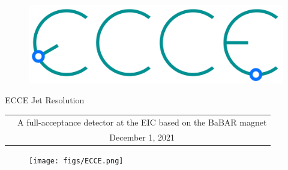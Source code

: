 \renewcommand*\familydefault{\sfdefault}
{\sffamily
\vfill
\vspace{4cm}
\begin{figure}[H]
  \begin{center}
  \includegraphics[width=0.3\linewidth]{figs/ecce-logo.png}
\end{center}
\end{figure}

\begin{center}
  \large
  {\LARGE{ECCE Jet Resolution}}

  \begin{tabular}{cc}
&A full-acceptance detector at the EIC based on the BaBAR magnet \\
&December 1, 2021 \\
  \end{tabular}
  \end{center}

\vspace{1cm}

\begin{figure}[H]
  \begin{center}
    \texttt{[image: figs/ECCE.png]}
  \end{center}
\end{figure}
}


\vfill
\renewcommand*\familydefault{\rmdefault}
